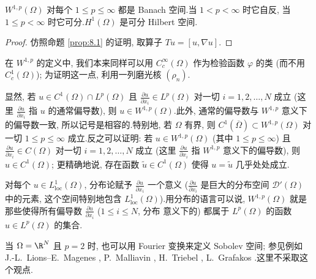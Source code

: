 \begin{keyproposition}
\label{prop:9.1}
$W^{1,p}(\Omega)$ 对每个 $1\le p\le\infty$ 都是 Banach 空间.当
$1<p<\infty$ 时它自反, 当 $1\le p<\infty$ 时它可分.$H^1(\Omega)$ 是可分
Hilbert 空间.
\end{keyproposition}

\begin{proof}
仿照命题  \ref{prop:8.1} 的证明, 取算子 $Tu=[u,\nabla u]$.
\end{proof}

\begin{remark}
\label{rem:9.1}
在 $W^{1,p}$ 的定义中, 我们本来同样可以用 $C_c^\infty(\Omega)$ 作为检验函数
$\varphi$ 的类 (而不用 $C_c^1(\Omega)$); 为证明这一点, 利用一列磨光核
$(\rho_n)$.
\end{remark}

\begin{remark}
\label{rem:9.2}
显然, 若 $u\in C^1(\Omega)\cap L^p(\Omega)$ 且
$\frac{\partial u}{\partial x_i}\in L^p(\Omega)$ 对一切 $i=1,2,\dots,N$
成立 (这里 $\frac{\partial u}{\partial x_i}$ 指 $u$ 的通常偏导数), 则
$u\in W^{1,p}(\Omega)$.此外, 通常的偏导数与 $W^{1,p}$ 意义下的偏导数一致,
所以记号是相容的.特别地, 若 $\Omega$ 有界, 则
$C^1(\overline\Omega)\subset W^{1,p}(\Omega)$ 对一切 $1\le p\le\infty$
成立.反之可以证明: 若 $u\in W^{1,p}(\Omega)$ (其中 $1\le p\le\infty$) 且
$\frac{\partial u}{\partial x_i}\in C(\Omega)$ 对一切 $i=1,2,\dots,N$ 成立
(这里 $\frac{\partial u}{\partial x_i}$ 指 $W^{1,p}$ 意义下的偏导数), 则
$u\in C^1(\Omega)$; 更精确地说, 存在函数 $\tilde u\in C^1(\Omega)$ 使得
$u=\tilde u$ 几乎处处成立.
\end{remark}

\begin{starremark}
\label{rem:9.3}
对每个 $u\in L^1_{\mathrm{loc}}(\Omega)$, 分布论赋予
$\frac{\partial u}{\partial x_i}$ 一个意义 ($\frac{\partial u}{\partial x_i}$
是巨大的分布空间 $\mathcal{D}'(\Omega)$ 中的元素, 这个空间特别地包含
$L^1_{\mathrm{loc}}(\Omega)$).用分布的语言可以说, $W^{1,p}(\Omega)$ 就是
那些使得所有偏导数 $\frac{\partial u}{\partial x_i}$ ($1\le i\le N$, 分布
意义下的) 都属于 $L^p(\Omega)$ 的函数 $u\in L^p(\Omega)$ 的集合.

当 $\Omega=\R^N$ 且 $p=2$ 时, 也可以用 Fourier 变换来定义 Sobolev 空间;
参见例如 J.-L.~Lions--E.~Magenes , P.~Malliavin , H.~Triebel , L.~Grafakos .这里不采取这个观点.
\end{starremark}

